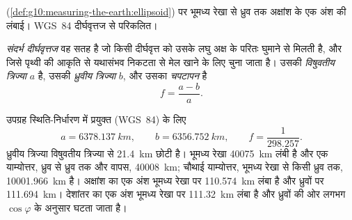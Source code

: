\begin{omfigure}

{\small {} (\cref{def:g10:measuring-the-earth:ellipsoid}) पर भूमध्य
रेखा से ध्रुव तक अक्षांश के एक अंश की लंबाई।
WGS~84 दीर्घवृत्तज से परिकलित।}
\end{omfigure}

\begin{definition}[संदर्भ दीर्घवृत्तज और चपटापन]\label{def:g10:measuring-the-earth:ellipsoid}
\emph{संदर्भ दीर्घवृत्तज} वह सतह है जो किसी दीर्घवृत्त को
उसके लघु अक्ष के परितः घुमाने से मिलती है, और जिसे पृथ्वी की आकृति से यथासंभव निकटता से
मेल खाने के लिए चुना जाता है। उसकी \emph{विषुवतीय त्रिज्या}
$a$ है, उसकी \emph{ध्रुवीय त्रिज्या} $b$, और उसका
\emph{चपटापन} है
\[
  f = \frac{a-b}{a}.
\]
\end{definition}

\begin{proposition}[पृथ्वी की विमाएँ]\label{prop:g10:measuring-the-earth:dimensions}
उपग्रह स्थिति-निर्धारण में प्रयुक्त  (WGS~84) के लिए
\[
  a = \qty{6378.137}{km}, \qquad b = \qty{6356.752}{km}, \qquad
  f = \frac{1}{298.257}.
\]
ध्रुवीय त्रिज्या विषुवतीय त्रिज्या से \qty{21.4}{km} छोटी है।
भूमध्य रेखा \qty{40075}{km} लंबी है और एक याम्योत्तर, ध्रुव से ध्रुव तक और वापस,
\qty{40008}{km}; चौथाई याम्योत्तर, भूमध्य रेखा से किसी ध्रुव तक,
\qty{10001.966}{km} है। अक्षांश का एक अंश भूमध्य रेखा पर \qty{110.574}{km} लंबा है
और ध्रुवों पर \qty{111.694}{km}। देशांतर का एक अंश भूमध्य रेखा पर
\qty{111.32}{km} लंबा है और ध्रुवों की ओर लगभग
$\cos \varphi$ के अनुसार घटता जाता है।
\end{proposition}

